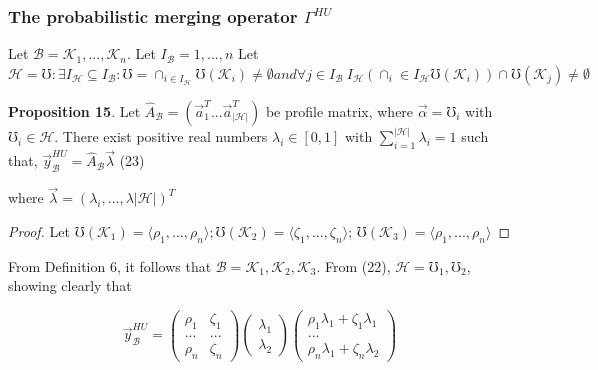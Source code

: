 \documentclass[]{iosart2c}
\begin{document}
  \subsubsection{The probabilistic merging operator $\Gamma^{HU}$}

  Let  $\mathcal{B} = {\mathcal{K}_1, ...,\mathcal{K}_n}$. Let $I_\mathcal{B} = {1, ..., n} $
  Let $\mathcal{H} = { \mho : \exists I_\mathcal{H} \subseteq I_\mathcal{B} : \mho = \cap_{i \in I_\mathcal{H}} \mho(\mathcal{K}_i) \neq \emptyset and \forall j \in I_\mathcal{B} \ I_\mathcal{H}(\cap_i\in I_\mathcal{H} \mho(\mathcal{K}_i)) \cap \mho(\mathcal{K}_j) \neq \emptyset }$

  \textbf{Proposition 15}. Let $\hat{A}_\mathcal{B} = (\vec{a}^T_1 ...\vec{a}^T_|\mathcal{H}|)$ be profile
  matrix, where $\vec{\alpha} = \mho_i$ with $\mho_i \in \mathcal{H}$. There exist positive
  real numbers $\lambda_i \in [0, 1]$ with $\sum^{|\mathcal{H}|}_{i=1} \lambda_i = 1$ such
  that,
  $\vec{y}^{HU}_\mathcal{B} = \hat{A}_\mathcal{B}\vec{\lambda}$ (23)

  where $\vec{\lambda} = (\lambda_i, ..., \lambda|\mathcal{H}|)^T$

  \begin{proof}
    Let $\mho(\mathcal{K}_1)=\langle \rho_1, ..., \rho_n \rangle;\mho(\mathcal{K}_2)=\langle\zeta_1, ..., \zeta_n \rangle$;
    $\mho(\mathcal{K}_3) = \langle\rho_1, ..., \rho_n\rangle$
  \end{proof}

  From Definition 6, it follows that $\mathcal{B} = {\mathcal{K}_1,
  \mathcal{K}_2,\mathcal{K}_3}$. From (22), $\mathcal{H} = {\mho_1,\mho_2}$, showing clearly
  that

  $$
  \vec{y}^{HU}_\mathcal{B} =
  \left( \begin{array}{cc}
           \rho_1 & \zeta_1 \\
           ...    & ...     \\
           \rho_n & \zeta_n
  \end{array} \right)
%
  \left( \begin{array}{cc}
           \lambda_1 \\
           \lambda_2
  \end{array}
  \right)
  \left( \begin{array}{cc}
           \rho_1\lambda_1 + \zeta_1\lambda_1 \\
           ...                                \\
           \rho_n\lambda_1 + \zeta_n\lambda_2
  \end{array} \right)
  $$
\end{document}
